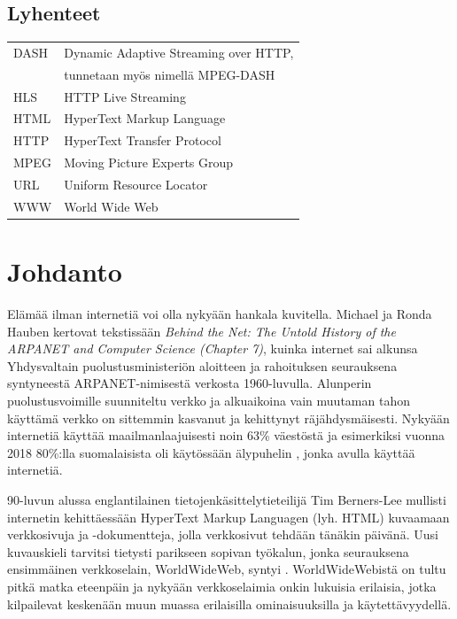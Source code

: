 \documentclass[finnish, 12pt, a4paper, elec, utf8, a-1b, online]{aaltothesis}
\begin{document}
\subsection*{Lyhenteet}
\begin{tabular}{ll}
  DASH      & Dynamic Adaptive Streaming over HTTP, \\
            & tunnetaan myös nimellä MPEG-DASH \\
  HLS       & HTTP Live Streaming \\
  HTML      & HyperText Markup Language \\
  HTTP      & HyperText Transfer Protocol \\
  MPEG      & Moving Picture Experts Group \\
  URL       & Uniform Resource Locator \\
  WWW       & World Wide Web \\
\end{tabular}

\cleardoublepage


\section{Johdanto}
  Elämää ilman internetiä voi olla nykyään hankala kuvitella. Michael ja Ronda Hauben kertovat tekstissään \textit{Behind the Net: The Untold History of the ARPANET and Computer Science (Chapter 7)}, kuinka internet sai alkunsa Yhdysvaltain puolustusministeriön aloitteen ja rahoituksen seurauksena syntyneestä ARPANET-nimisestä verkosta 1960-luvulla. \cite{Hauben} Alunperin puolustusvoimille suunniteltu verkko ja alkuaikoina vain muutaman tahon käyttämä verkko on sittemmin kasvanut ja kehittynyt räjähdysmäisesti. Nykyään internetiä käyttää maailmanlaajuisesti noin 63\% väestöstä \cite{ITU} ja esimerkiksi vuonna 2018 80\%:lla suomalaisista oli käytössään älypuhelin \cite{SVT}, jonka avulla käyttää internetiä.

  90-luvun alussa englantilainen tietojenkäsittelytieteilijä Tim Berners-Lee mullisti internetin kehittäessään HyperText Markup Languagen (lyh. HTML) kuvaamaan verkkosivuja ja -dokumentteja, jolla verkkosivut tehdään tänäkin päivänä. Uusi kuvauskieli tarvitsi tietysti parikseen sopivan työkalun, jonka seurauksena ensimmäinen verkkoselain, WorldWideWeb, syntyi \cite{WorldWideWeb}. WorldWideWebistä on tultu pitkä matka eteenpäin ja nykyään verkkoselaimia onkin lukuisia erilaisia, jotka kilpailevat keskenään muun muassa erilaisilla ominaisuuksilla ja käytettävyydellä.
\end{document}
